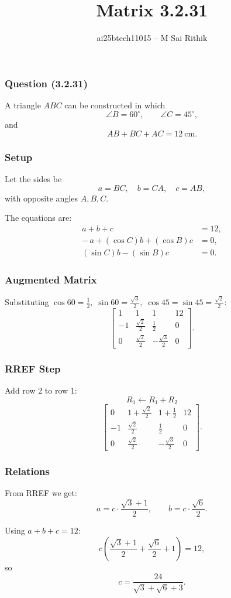 \documentclass{beamer}
\title{Matrix 3.2.31}
\author{ai25btech11015 -- M Sai Rithik}
\date{}
\begin{document}
\frame{\titlepage}

\begin{frame}
\frametitle{Question (3.2.31)}
A triangle \(ABC\) can be constructed in which
\[
\angle B = 60^\circ,\qquad \angle C = 45^\circ,
\]
and
\[
AB + BC + AC = 12\ \text{cm}.
\]
\end{frame}

\begin{frame}
\frametitle{Setup}
Let the sides be
\[
a = BC,\quad b = CA,\quad c = AB,
\]
with opposite angles \(A,B,C\).

The equations are:
\begin{align}
a + b + c &= 12, \\
-\,a + (\cos C)b + (\cos B)c &= 0, \\
(\sin C)b - (\sin B)c &= 0.
\end{align}
\end{frame}

\begin{frame}
\frametitle{Augmented Matrix}
Substituting \(\cos60=\tfrac12,\;\sin60=\tfrac{\sqrt3}{2},\;\cos45=\sin45=\tfrac{\sqrt2}{2}\):
\[
\left[
\begin{array}{ccc|c}
1 & 1 & 1 & 12 \\[4pt]
-1 & \tfrac{\sqrt{2}}{2} & \tfrac{1}{2} & 0 \\[6pt]
0 & \tfrac{\sqrt{2}}{2} & -\tfrac{\sqrt{3}}{2} & 0
\end{array}
\right].
\]
\end{frame}

\begin{frame}
\frametitle{RREF Step}
Add row 2 to row 1:
\[
R_1 \gets R_1 + R_2
\]
\[
\left[
\begin{array}{ccc|c}
0 & 1+\tfrac{\sqrt{2}}{2} & 1+\tfrac{1}{2} & 12 \\[6pt]
-1 & \tfrac{\sqrt{2}}{2} & \tfrac{1}{2} & 0 \\[6pt]
0 & \tfrac{\sqrt{2}}{2} & -\tfrac{\sqrt{3}}{2} & 0
\end{array}
\right].
\]
\end{frame}

\begin{frame}
\frametitle{Relations}
From RREF we get:
\[
a = c\cdot\frac{\sqrt{3}+1}{2}, \qquad
b = c\cdot\frac{\sqrt{6}}{2}.
\]

Using \(a+b+c=12\):
\[
c\left(\frac{\sqrt{3}+1}{2}+\frac{\sqrt{6}}{2}+1\right) = 12,
\]
so
\[
c = \frac{24}{\sqrt{3}+\sqrt{6}+3}.
\]
\end{frame}
\end{document}
